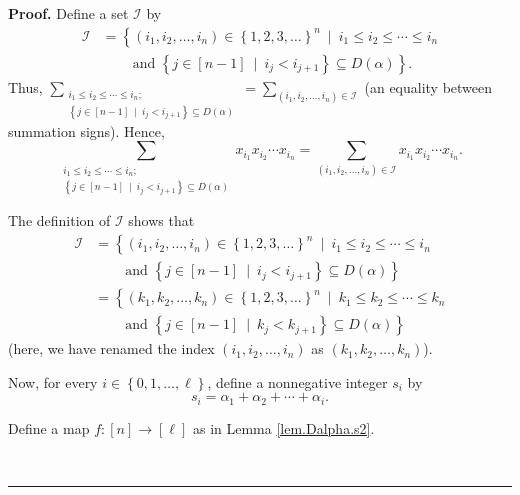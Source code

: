 \documentclass[numbers=enddot,12pt,final,onecolumn,notitlepage,abstracton]{scrartcl}
\theoremstyle{definition}
\newenvironment{proof}[1][Proof]{\noindent\textbf{#1.} }{\ \rule{0.5em}{0.5em}}
\let\sumnonlimits\sum
\renewcommand{\sum}{\sumnonlimits\limits}
\newenvironment{verlong}{}{}
\begin{document}
\begin{verlong}
\begin{footnotesize}
\begin{proof}
Define a set $\mathcal{I}$ by%
\begin{align}
\mathcal{I}  &  =\left\{  \left(  i_{1},i_{2},\ldots,i_{n}\right)  \in\left\{
1,2,3,\ldots\right\}  ^{n}\ \mid\ i_{1}\leq i_{2}\leq\cdots\leq i_{n}\right.
\nonumber\\
&  \ \ \ \ \ \ \ \ \ \ \left.  \text{and }\left\{  j\in\left[  n-1\right]
\ \mid\ i_{j}<i_{j+1}\right\}  \subseteq D\left(  \alpha\right)  \right\}  .
\label{pf.prop.SMalpha.D.I=}%
\end{align}
Thus, $\sum_{\substack{i_{1}\leq i_{2}\leq\cdots\leq i_{n};\\\left\{
j\in\left[  n-1\right]  \ \mid\ i_{j}<i_{j+1}\right\}  \subseteq D\left(
\alpha\right)  }}=\sum_{\left(  i_{1},i_{2},\ldots,i_{n}\right)
\in\mathcal{I}}$ (an equality between summation signs). Hence,%
\begin{equation}
\sum_{\substack{i_{1}\leq i_{2}\leq\cdots\leq i_{n};\\\left\{  j\in\left[
n-1\right]  \ \mid\ i_{j}<i_{j+1}\right\}  \subseteq D\left(  \alpha\right)
}}x_{i_{1}}x_{i_{2}}\cdots x_{i_{n}}=\sum_{\left(  i_{1},i_{2},\ldots
,i_{n}\right)  \in\mathcal{I}}x_{i_{1}}x_{i_{2}}\cdots x_{i_{n}}.
\label{pf.prop.SMalpha.D.RHS=}%
\end{equation}


The definition of $\mathcal{I}$ shows that%
\begin{align*}
\mathcal{I}  &  =\left\{  \left(  i_{1},i_{2},\ldots,i_{n}\right)  \in\left\{
1,2,3,\ldots\right\}  ^{n}\ \mid\ i_{1}\leq i_{2}\leq\cdots\leq i_{n}\right.
\\
&  \ \ \ \ \ \ \ \ \ \ \left.  \text{and }\left\{  j\in\left[  n-1\right]
\ \mid\ i_{j}<i_{j+1}\right\}  \subseteq D\left(  \alpha\right)  \right\} \\
&  =\left\{  \left(  k_{1},k_{2},\ldots,k_{n}\right)  \in\left\{
1,2,3,\ldots\right\}  ^{n}\ \mid\ k_{1}\leq k_{2}\leq\cdots\leq k_{n}\right.
\\
&  \ \ \ \ \ \ \ \ \ \ \left.  \text{and }\left\{  j\in\left[  n-1\right]
\ \mid\ k_{j}<k_{j+1}\right\}  \subseteq D\left(  \alpha\right)  \right\}
\end{align*}
(here, we have renamed the index $\left(  i_{1},i_{2},\ldots,i_{n}\right)  $
as $\left(  k_{1},k_{2},\ldots,k_{n}\right)  $).

Now, for every $i\in\left\{  0,1,\ldots,\ell\right\}  $, define a nonnegative
integer $s_{i}$ by
\[
s_{i}=\alpha_{1}+\alpha_{2}+\cdots+\alpha_{i}.
\]


Define a map $f:\left[  n\right]  \rightarrow\left[  \ell\right]  $ as in
Lemma \ref{lem.Dalpha.s2}.


\end{proof}
\end{footnotesize}
\end{verlong}
\end{document}
